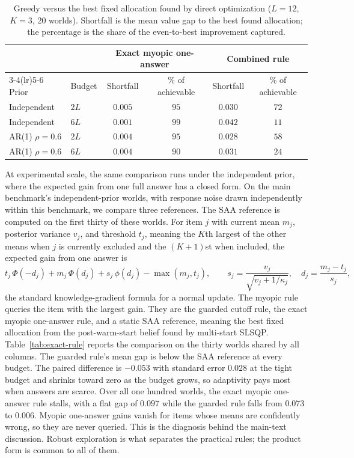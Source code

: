 \documentclass[11pt]{article}
\theoremstyle{definition}
\theoremstyle{remark}
\newcommand{\1}{\mathbf{1}}
\begin{document}
\begin{table}[h!]
\centering
\scriptsize
\setlength{\tabcolsep}{5pt}
\begin{tabular}{llcccc}
\toprule
 & & \multicolumn{2}{c}{Exact myopic one-answer} & \multicolumn{2}{c}{Combined rule} \\
\cmidrule(lr){3-4}\cmidrule(lr){5-6}
Prior & Budget & Shortfall & \% of achievable & Shortfall & \% of achievable \\
\midrule
Independent & $2L$ & $0.005$ & $95$ & $0.030$ & $72$ \\
Independent & $6L$ & $0.001$ & $99$ & $0.042$ & $11$ \\
AR(1) $\rho=0.6$ & $2L$ & $0.004$ & $95$ & $0.028$ & $58$ \\
AR(1) $\rho=0.6$ & $6L$ & $0.004$ & $90$ & $0.031$ & $24$ \\
\bottomrule
\end{tabular}
\caption{Greedy versus the best fixed allocation found by direct optimization (\(L=12\), \(K=3\), 20 worlds). Shortfall is the mean value gap to the best found allocation; the percentage is the share of the even-to-best improvement captured.}
\label{tab:greedy-optimal}
\end{table}

At experimental scale, the same comparison runs under the independent
prior, where the expected gain from one full answer has a closed form. On the main benchmark's independent-prior worlds, with response noise drawn independently within this benchmark, we compare three references. The SAA reference is computed on the first thirty of these worlds. For item \(j\) with current mean \(m_j\), posterior variance \(v_j\), and threshold \(t_j\), meaning the \(K\)th largest of the other means when \(j\) is currently excluded and the \((K{+}1)\)st when included, the expected gain from one answer is
\[
t_j\,\Phi(-d_j)+m_j\,\Phi(d_j)+s_j\,\phi(d_j)-\max(m_j,t_j),
\qquad
s_j=\frac{v_j}{\sqrt{v_j+1/\kappa_j}},\quad
d_j=\frac{m_j-t_j}{s_j},
\]
the standard knowledge-gradient formula for a normal update. The myopic rule queries the item with the largest gain. They are the
guarded cutoff rule, the exact myopic one-answer rule, and a static SAA
reference, meaning the best fixed allocation from the
post-warm-start belief found by multi-start SLSQP.
Table~\ref{tab:exact-rule} reports the comparison on the thirty worlds
shared by all columns. The guarded rule's mean gap is below the SAA
reference at every budget. The paired difference is \(-0.053\) with
standard error \(0.028\) at the tight budget and shrinks toward zero
as the budget grows, so adaptivity pays most when answers are scarce.
Over all one hundred worlds, the exact myopic one-answer rule stalls,
with a flat gap of \(0.097\) while the guarded rule falls from
\(0.073\) to \(0.006\). Myopic one-answer gains vanish for items
whose means are confidently wrong, so they are never queried. This is the diagnosis behind the main-text discussion. Robust
exploration is what separates the practical rules; the product form is
common to all of them.
\end{document}
